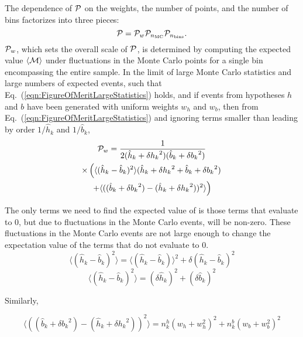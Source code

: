 \documentclass[twocolumn,twoside,prd]{revtex4} %
\begin{document}
The dependence of ${\cal P}$ on the weights, the number of points, and the number of bins factorizes into three pieces:
\begin{equation}
\label{eqn:PenaltyTerm}
{\cal P} = {\cal P}_w {\cal P}_{n_\text{MC}} {\cal P}_{n_\text{bins}}.
\end{equation}
${\cal P}_w$, which sets the overall scale of ${\cal P}$, is determined by computing the expected value $\langle {\cal M} \rangle$ under fluctuations in the Monte Carlo points for a single bin encompassing the entire sample.  In the limit of large Monte Carlo statistics and large numbers of expected events, such that Eq.~(\ref{eqn:FigureOfMeritLargeStatistics}) holds, and if events from hypotheses $h$ and $b$ have been generated with uniform weights $w_h$ and $w_b$, then from Eq.~(\ref{eqn:FigureOfMeritLargeStatistics}) and ignoring terms smaller than leading by order $1/\hat h_k$ and $1/\hat b_k$,
\begin{multline}
\label{eqn:PenaltyTermWComplicated1}
{\cal P}_w = \frac {1} { 2(\hat h_k+{\delta h_k}^2)(\hat b_k + {\delta b_k}^2) }\\  
\times \left(\langle (\hat h_k-\hat b_k)^2 \rangle(\hat h_k + {\delta h_k}^2 + \hat b_k + {\delta b_k}^2) \right. \\
 \left. + \langle ((\hat b_k+{\delta b_k}^2) - (\hat h_k+{\delta h_k}^2))^2 \rangle \right)
\end{multline}

The only terms we need to find the expected value of is those terms that evaluate to 0, but due to fluctuations in the Monte Carlo events, will be non-zero.  These fluctuations in the Monte Carlo events are not large enough to change the expectation value of the terms that do not evaluate to 0.
\begin{equation}
\label{eqn:PenaltyTermWComplicated2}
\langle (\hat h_k-\hat b_k)^2 \rangle = \langle (\hat h_k-\hat b_k) \rangle^2 +  \delta (\hat h_k-\hat b_k)^2
\end{equation}
\begin{equation}
\label{eqn:PenaltyTermWComplicated2}
\langle (\hat h_k-\hat b_k)^2 \rangle = (\delta \hat h_k)^2 + (\delta \hat b_k)^2
\end{equation}

Similarly,

\begin{equation}
\label{eqn:PenaltyTermWComplicated3}
\langle ((\hat b_k+{\delta b_k}^2) - (\hat h_k+{\delta h_k}^2))^2 \rangle = n_k^h(w_h+w_h^2)^2 +  n_k^b(w_b+w_b^2)^2 
\end{equation}
\end{document}
